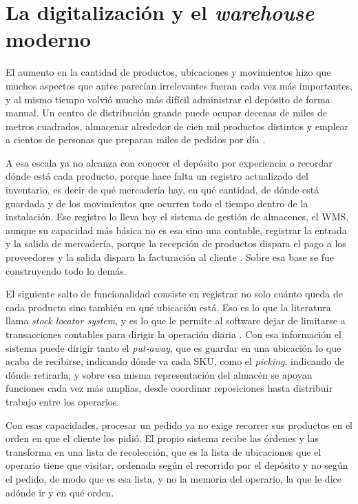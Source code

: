 \section{La digitalización y el \emph{warehouse} moderno}
\label{sec:digitalizacion}

El aumento en la cantidad de productos, ubicaciones y movimientos hizo que muchos aspectos que antes parecían irrelevantes fueran cada vez más importantes, y al mismo tiempo volvió mucho más difícil administrar el depósito de forma manual.
Un centro de distribución grande puede ocupar decenas de miles de metros cuadrados, almacenar alrededor de cien mil productos distintos y emplear a cientos de personas que preparan miles de pedidos por día \citep[capítulo~4]{bartholdi2014warehouse}.

A esa escala ya no alcanza con conocer el depósito por experiencia o recordar dónde está cada producto, porque hace falta un registro actualizado del inventario, es decir de qué mercadería hay, en qué cantidad, de dónde está guardada y de los movimientos que ocurren todo el tiempo dentro de la instalación.
Ese registro lo lleva hoy el sistema de gestión de almacenes, el \gls{WMS}, aunque su capacidad más básica no es esa sino una contable, registrar la entrada y la salida de mercadería, porque la recepción de productos dispara el pago a los proveedores y la salida dispara la facturación al cliente \citep[sección~4.1]{bartholdi2014warehouse}.
Sobre esa base se fue construyendo todo lo demás.

El siguiente salto de funcionalidad consiste en registrar no solo cuánto queda de cada producto sino también en qué ubicación está.
Eso es lo que la literatura llama \emph{stock locator system}, y es lo que le permite al software dejar de limitarse a transacciones contables para dirigir la operación diaria \citep[sección~4.2]{bartholdi2014warehouse}.
Con esa información el sistema puede dirigir tanto el \emph{put-away}, que es guardar en una ubicación lo que acaba de recibirse, indicando dónde va cada SKU, como el \emph{picking}, indicando de dónde retirarla, y sobre esa misma representación del almacén se apoyan funciones cada vez más amplias, desde coordinar reposiciones hasta distribuir trabajo entre los operarios.

Con esas capacidades, procesar un pedido ya no exige recorrer sus productos en el orden en que el cliente los pidió.
El propio sistema recibe las órdenes y las transforma en una lista de recolección, que es la lista de ubicaciones que el operario tiene que visitar, ordenada según el recorrido por el depósito y no según el pedido, de modo que es esa lista, y no la memoria del operario, la que le dice adónde ir y en qué orden.

